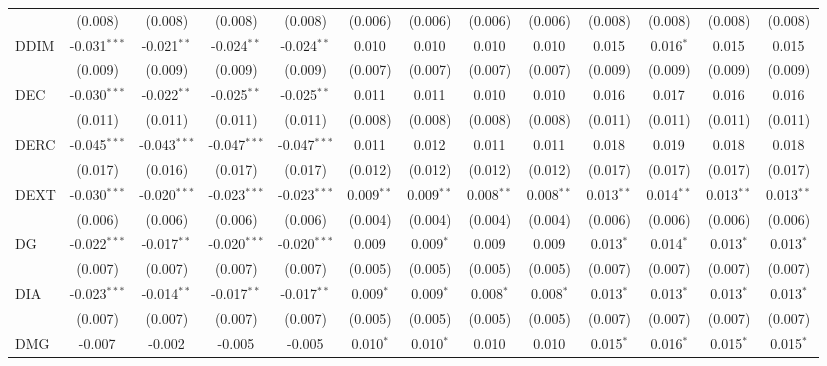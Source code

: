 \begin{table}[!htbp]
\begin{tabular}{@{\extracolsep{5pt}}lcccccccccccc}
  & (0.008) & (0.008) & (0.008) & (0.008) & (0.006) & (0.006) & (0.006) & (0.006) & (0.008) & (0.008) & (0.008) & (0.008) \\
 DDIM & -0.031$^{***}$ & -0.021$^{**}$ & -0.024$^{**}$ & -0.024$^{**}$ & 0.010$^{}$ & 0.010$^{}$ & 0.010$^{}$ & 0.010$^{}$ & 0.015$^{}$ & 0.016$^{*}$ & 0.015$^{}$ & 0.015$^{}$ \\
  & (0.009) & (0.009) & (0.009) & (0.009) & (0.007) & (0.007) & (0.007) & (0.007) & (0.009) & (0.009) & (0.009) & (0.009) \\
 DEC & -0.030$^{***}$ & -0.022$^{**}$ & -0.025$^{**}$ & -0.025$^{**}$ & 0.011$^{}$ & 0.011$^{}$ & 0.010$^{}$ & 0.010$^{}$ & 0.016$^{}$ & 0.017$^{}$ & 0.016$^{}$ & 0.016$^{}$ \\
  & (0.011) & (0.011) & (0.011) & (0.011) & (0.008) & (0.008) & (0.008) & (0.008) & (0.011) & (0.011) & (0.011) & (0.011) \\
 DERC & -0.045$^{***}$ & -0.043$^{***}$ & -0.047$^{***}$ & -0.047$^{***}$ & 0.011$^{}$ & 0.012$^{}$ & 0.011$^{}$ & 0.011$^{}$ & 0.018$^{}$ & 0.019$^{}$ & 0.018$^{}$ & 0.018$^{}$ \\
  & (0.017) & (0.016) & (0.017) & (0.017) & (0.012) & (0.012) & (0.012) & (0.012) & (0.017) & (0.017) & (0.017) & (0.017) \\
 DEXT & -0.030$^{***}$ & -0.020$^{***}$ & -0.023$^{***}$ & -0.023$^{***}$ & 0.009$^{**}$ & 0.009$^{**}$ & 0.008$^{**}$ & 0.008$^{**}$ & 0.013$^{**}$ & 0.014$^{**}$ & 0.013$^{**}$ & 0.013$^{**}$ \\
  & (0.006) & (0.006) & (0.006) & (0.006) & (0.004) & (0.004) & (0.004) & (0.004) & (0.006) & (0.006) & (0.006) & (0.006) \\
 DG & -0.022$^{***}$ & -0.017$^{**}$ & -0.020$^{***}$ & -0.020$^{***}$ & 0.009$^{}$ & 0.009$^{*}$ & 0.009$^{}$ & 0.009$^{}$ & 0.013$^{*}$ & 0.014$^{*}$ & 0.013$^{*}$ & 0.013$^{*}$ \\
  & (0.007) & (0.007) & (0.007) & (0.007) & (0.005) & (0.005) & (0.005) & (0.005) & (0.007) & (0.007) & (0.007) & (0.007) \\
 DIA & -0.023$^{***}$ & -0.014$^{**}$ & -0.017$^{**}$ & -0.017$^{**}$ & 0.009$^{*}$ & 0.009$^{*}$ & 0.008$^{*}$ & 0.008$^{*}$ & 0.013$^{*}$ & 0.013$^{*}$ & 0.013$^{*}$ & 0.013$^{*}$ \\
  & (0.007) & (0.007) & (0.007) & (0.007) & (0.005) & (0.005) & (0.005) & (0.005) & (0.007) & (0.007) & (0.007) & (0.007) \\
 DMG & -0.007$^{}$ & -0.002$^{}$ & -0.005$^{}$ & -0.005$^{}$ & 0.010$^{*}$ & 0.010$^{*}$ & 0.010$^{}$ & 0.010$^{}$ & 0.015$^{*}$ & 0.016$^{*}$ & 0.015$^{*}$ & 0.015$^{*}$ \\

\end{tabular}
\end{table}
